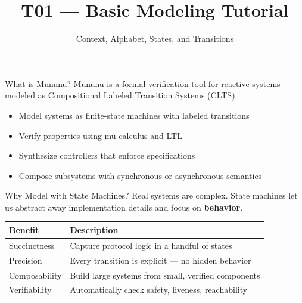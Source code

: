 

\title{T01 --- Basic Modeling Tutorial}
\subtitle{Context, Alphabet, States, and Transitions}



\maketitle

\begin{frame}{What is Mununu?}
  Mununu is a \alert{formal verification tool} for reactive systems modeled as
  Compositional Labeled Transition Systems (CLTS).

  \bigskip
  \begin{itemize}
    \item Model systems as finite-state machines with labeled transitions
    \item Verify properties using mu-calculus and LTL
    \item Synthesize controllers that enforce specifications
    \item Compose subsystems with synchronous or asynchronous semantics
  \end{itemize}
\end{frame}

\begin{frame}{Why Model with State Machines?}
  Real systems are complex. State machines let us \alert{abstract away}
  implementation details and focus on \textbf{behavior}.

  \bigskip
  \begin{center}
  \begin{tabularx}{0.88\textwidth}{lX}
    \toprule
    \textbf{Benefit} & \textbf{Description} \\
    \midrule
    Succinctness  & Capture protocol logic in a handful of states \\
    Precision     & Every transition is explicit --- no hidden behavior \\
    Composability & Build large systems from small, verified components \\
    Verifiability & Automatically check safety, liveness, reachability \\
    \bottomrule
  \end{tabularx}
  \end{center}
\end{frame}


